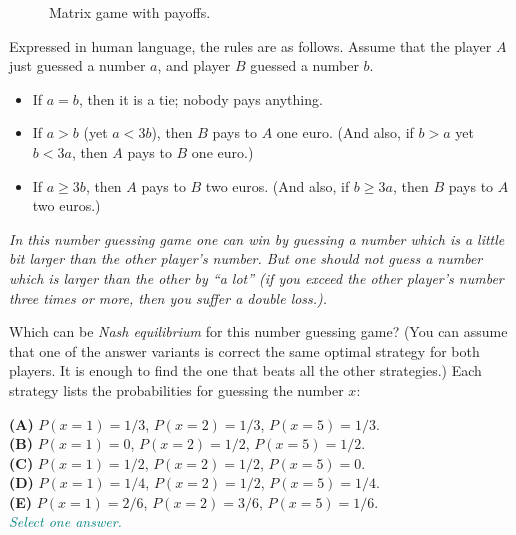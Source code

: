 \documentclass[jou]{apa6}
\begin{document}
\begin{figure}[!htb]
\caption{\label{fig:matrix-game} Matrix game with payoffs.}
\end{figure}

Expressed in human language, the rules are as follows. 
Assume that the player $A$ just guessed a number $a$, and player $B$ guessed 
a number $b$. 
\begin{itemize}
\item If $a=b$, then it is a tie; nobody pays anything.
\item If $a>b$ (yet $a < 3b$), then $B$ pays to $A$ one euro. (And also, 
if $b>a$ yet $b < 3a$, then $A$ pays to $B$ one euro.)
\item If $a \geq 3b$, then $A$ pays to $B$ two euros. (And also, if $b \geq 3a$, 
then $B$ pays to $A$ two euros.)
\end{itemize}

{\em In this number guessing game one can win by guessing a number which is a little
bit larger than the other player's number. But one should not guess a number which is 
larger than the other by ``a lot'' (if you exceed the other player's number
three times or more, then you suffer a double loss.).}

Which can be {\em Nash equilibrium} for this number guessing game?
(You can assume that one of the answer variants is correct \textendash{} 
the same optimal strategy for both players. It is enough to find the 
one that beats all the other strategies.) 
Each strategy lists the probabilities for guessing the number $x$: 

{\bf (A)} $P(x = 1) = 1/3$, $P(x = 2) = 1/3$, $P(x = 5) = 1/3$.\\
{\bf (B)} $P(x = 1) = 0$, $P(x = 2) = 1/2$, $P(x = 5) = 1/2$.\\
{\bf (C)} $P(x = 1) = 1/2$, $P(x = 2) = 1/2$, $P(x = 5) = 0$.\\
{\bf (D)} $P(x = 1) = 1/4$, $P(x = 2) = 1/2$, $P(x = 5) = 1/4$.\\
{\bf (E)} $P(x = 1) = 2/6$, $P(x = 2) = 3/6$, $P(x = 5) = 1/6$.\\
\textcolor{teal}{\em Select one answer.}
\end{document}
